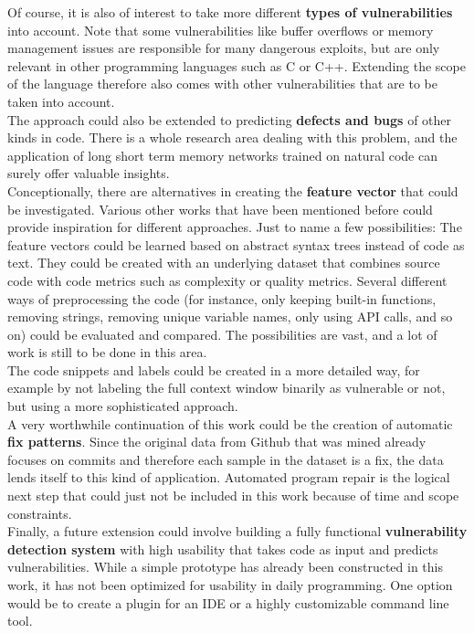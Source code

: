 \documentclass[
a4paper,
pagesize,
pdftex,
12pt,
ngerman,
fleqn,
final,
]{scrartcl}
\begin{document}
	Of course, it is also of interest to take more different \textbf{types of vulnerabilities} into account. Note that some vulnerabilities like buffer overflows or memory management issues are responsible for many dangerous exploits, but are only relevant in other programming languages such as C or C++. Extending the scope of the language therefore also comes with other vulnerabilities that are to be taken into account.\\
	The approach could also be extended to predicting \textbf{defects and bugs} of other kinds in code. There is a whole research area dealing with this problem, and the application of long short term memory networks trained on natural code can surely offer valuable insights.\\
	Conceptionally, there are alternatives in creating the \textbf{feature vector} that could be investigated. Various other works that have been mentioned before could provide inspiration for different approaches. Just to name a few possibilities: The feature vectors could be learned based on abstract syntax trees instead of code as text. They could be created with an underlying dataset that combines source code with code metrics such as complexity or quality metrics. Several different ways of preprocessing the code (for instance, only keeping built-in functions, removing strings, removing unique variable names, only using API calls, and so on) could be evaluated and compared. The possibilities are vast, and a lot of work is still to be done in this area.\\
	The code snippets and labels could be created in a more detailed way, for example by not labeling the full context window binarily as vulnerable or not, but using a more sophisticated approach.\\
	A very worthwhile continuation of this work could be the creation of automatic \textbf{fix patterns}. Since the original data from Github that was mined already focuses on commits and therefore each sample in the dataset is a fix, the data lends itself to this kind of application. Automated program repair is the logical next step that could just not be included in this work because of time and scope constraints.\\
	Finally, a future extension could involve building a fully functional \textbf{vulnerability detection system} with high usability that takes code as input and predicts vulnerabilities. While a simple prototype has already been constructed in this work, it has not been optimized for usability in daily programming. One option would be to create a plugin for an IDE or a highly customizable command line tool.
	
\end{document}
